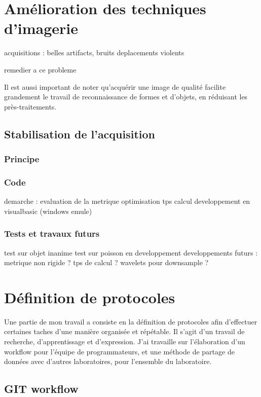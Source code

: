 \section{Amélioration des techniques d'imagerie}


acquisitions :
belles
artifacts, bruits
deplacements violents

remedier a ce probleme


Il est aussi important de noter qu'acquérir une image de qualité facilite grandement le travail de reconnaissance de formes et d'objets, en réduisant les près-traitements.

\subsection{Stabilisation de l'acquisition}

\subsubsection{Principe}


\subsubsection{Code}

demarche : evaluation de la metrique
optimisation tps calcul
developpement en visualbasic (windows emule)

\subsubsection{Tests et travaux futurs}
test sur objet inanime
test sur poisson en developpement
developpements futurs :
metrique non rigide ?
tps de calcul ?
wavelets pour downsample ?


\section{Définition de protocoles}

Une partie de mon travail a consiste en la définition de protocoles afin d'effectuer certaines taches d'une manière organisée et répétable. Il s'agit d'un travail de recherche, d'apprentissage et d'expression. J'ai travaille sur l'élaboration d'un workflow pour l'équipe de programmateurs, et une méthode de partage de données avec d'autres laboratoires, pour l'ensemble du laboratoire.

\subsection{GIT workflow}

